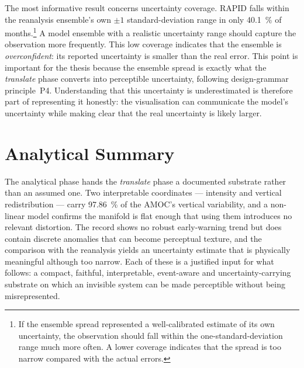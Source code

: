 %

The most informative result concerns uncertainty coverage. RAPID falls within the reanalysis ensemble's own $\pm1$ standard-deviation range in only \SI{40.1}{\percent} of months.\footnote{If the ensemble spread represented a well-calibrated estimate of its own uncertainty, the observation should fall within the one-standard-deviation range much more often. A lower coverage indicates that the spread is too narrow compared with the actual errors.} A model ensemble with a realistic uncertainty range should capture the observation more frequently. This low coverage indicates that the ensemble is \emph{overconfident}: its reported uncertainty is smaller than the real error. This point is important for the thesis because the ensemble spread is exactly what the \emph{translate} phase converts into perceptible uncertainty, following design-grammar principle~P4. Understanding that this uncertainty is underestimated is therefore part of representing it honestly: the visualisation can communicate the model's uncertainty while making clear that the real uncertainty is likely larger.

\section{Analytical Summary}
\label{sec:detect-summary}

The analytical phase hands the \emph{translate} phase a documented substrate rather than an assumed one. Two interpretable coordinates --- intensity and vertical redistribution --- carry \SI{97.86}{\percent} of the AMOC's vertical variability, and a non-linear model confirms the manifold is flat enough that using them introduces no relevant distortion. The record shows no robust early-warning trend but does contain discrete anomalies that can become perceptual texture, and the comparison with the reanalysis yields an uncertainty estimate that is physically meaningful although too narrow. Each of these is a justified input for what follows: a compact, faithful, interpretable, event-aware and uncertainty-carrying substrate on which an invisible system can be made perceptible without being misrepresented.